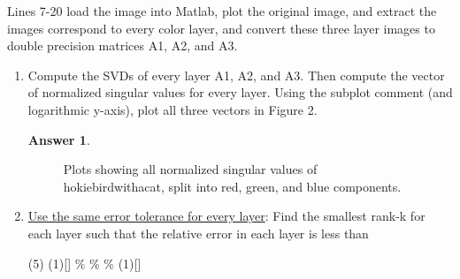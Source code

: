 \documentclass{article}
\theoremstyle{definition}
\newtheorem*{answer}{Answer}
\begin{document}
\begin{enumerate}[leftmargin=\labelsep]
	      Lines 7-20 load the image into Matlab, plot the original image, and extract the images correspond to every color layer, and convert these three layer images to double precision matrices A1, A2, and A3.
	      \begin{enumerate}
		      \item Compute the SVDs of every layer A1, A2, and A3. Then compute the vector of normalized singular values for every layer. Using the subplot comment (and logarithmic y-axis), plot all three vectors in Figure 2.
		            \begin{answer}
			            \begin{figure}[H]
				            \centering{}
				            \caption{Plots showing all normalized singular values of hokiebirdwithacat, split into red, green, and blue components.}\label{fig:birdsingvals}
			            \end{figure}
		            \end{answer}

		      \item \underline{Use the same error tolerance for every layer}: Find the smallest rank-k for each layer such that the relative error in each layer is less than

		            \begin{tasks}[label = {(\roman*)}, label-width = 1.75em, label-offset = 0em](5)
			            \task*(1)[]
			            \%
			            \%
			            \%
			            \task*(1)[]
		            \end{tasks}


\end{enumerate}
\end{enumerate}
\end{document}
